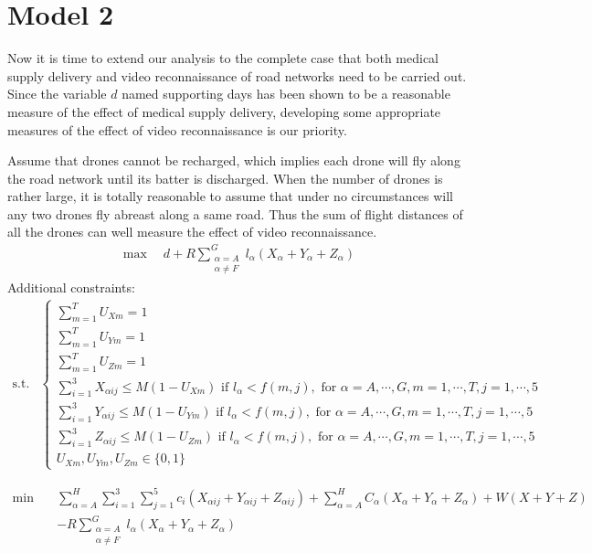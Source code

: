 \documentclass{mcmthesis}
\begin{document}
\section{Model 2}

Now it is time to extend our analysis to the complete case that both medical supply delivery and video reconnaissance of road networks need to be carried out. Since the variable $d$ named supporting days has been shown to be a reasonable measure of the effect of medical supply delivery, developing some appropriate measures of the effect of video reconnaissance is our priority.

\noindent Assume that drones cannot be recharged, which implies each drone will fly along the road network until its batter is discharged. When the number of drones is rather large, it is totally reasonable to assume that under no circumstances will any two drones fly abreast along a same road. Thus the sum of flight distances of all the drones can well measure the effect of video reconnaissance.
\[
\begin{aligned}
\max\quad d+R\sum_{\substack{\alpha=A\\ \alpha\ne F}}^{G}l_\alpha (X_\alpha+Y_\alpha+Z_\alpha)
\end{aligned}
\]
Additional constraints:
\[
\begin{aligned}
\text{s.t.}&
\left\{
\begin{array}{lr}
\sum\limits_{m=1}^{T}U_{Xm}=1\\
\sum\limits_{m=1}^{T}U_{Ym}=1\\
\sum\limits_{m=1}^{T}U_{Zm}=1\\
\sum\limits_{i=1}^3X_{\alpha ij}\le M(1-U_{Xm})\text{ if }l_{\alpha}< f(m,j)  ,\text{ for }\alpha=A,\cdots,G,m=1,\cdots,T,j=1,\cdots,5\\
\sum\limits_{i=1}^3Y_{\alpha ij}\le M(1-U_{Ym})\text{ if }l_{\alpha}< f(m,j)  ,\text{ for }\alpha=A,\cdots,G,m=1,\cdots,T,j=1,\cdots,5\\
\sum\limits_{i=1}^3Z_{\alpha ij}\le M(1-U_{Zm})\text{ if }l_{\alpha}< f(m,j)  ,\text{ for }\alpha=A,\cdots,G,m=1,\cdots,T,j=1,\cdots,5\\
U_{Xm},U_{Ym},U_{Zm} \in \{0,1\}
\end{array}
\right.
\end{aligned}
\]


\[
\begin{aligned}
\min\quad&\sum_{\alpha=A}^{H}\sum_{i=1}^{3}\sum_{j=1}^{5}c_{i}\left(X_{\alpha ij}+Y_{\alpha ij}+Z_{\alpha ij}\right)
+\sum_{\alpha=A}^{H}C_{{\alpha}}\left(X_{\alpha}+Y_{\alpha }+Z_{\alpha }\right)+W(X+Y+Z)\\
&-R\sum_{\substack{\alpha=A\\ \alpha\ne F}}^{G}l_\alpha (X_\alpha+Y_\alpha+Z_\alpha)
\end{aligned}
\]
\end{document}
